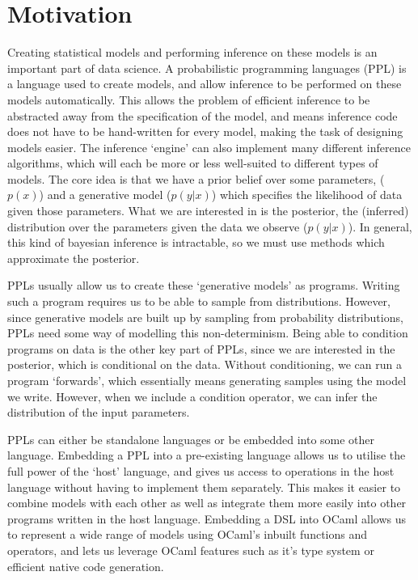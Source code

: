 \section{Motivation}

Creating statistical models and performing inference on these models is an important part of data science. A probabilistic programming languages (PPL) is a language used to create models, and allow inference to be performed on these models automatically. This allows the problem of efficient inference to be abstracted away from the specification of the model, and means inference code does not have to be hand-written for every model, making the task of designing models easier. The inference `engine' can also implement many different inference algorithms, which will each be more or less well-suited to different types of models. The core idea is that we have a prior belief over some parameters, ($p(x)$) and a generative model ($p(y|x)$) which specifies the likelihood of data given those parameters. What we are interested in is the posterior, the (inferred) distribution over the parameters given the data we observe ($p(y|x)$). In general, this kind of bayesian inference is intractable, so we must use methods which approximate the posterior.

PPLs usually allow us to create these `generative models' as programs. Writing such a program requires us to be able to sample from distributions. However, since generative models are built up by sampling from probability distributions, PPLs need some way of modelling this non-determinism. Being able to condition programs on data is the other key part of PPLs, since we are interested in the posterior, which is conditional on the data. Without conditioning, we can run a program `forwards', which essentially means generating samples using the model we write. However, when we include a condition operator, we can infer the distribution of the input parameters.

PPLs can either be standalone languages or be embedded into some other language. Embedding a PPL into a pre-existing language allows us to utilise the full power of the `host' language, and gives us access to operations in the host language without having to implement them separately. This makes it easier to combine models with each other as well as integrate them more easily into other programs written in the host language. Embedding a DSL into OCaml allows us to represent a wide range of models using OCaml's inbuilt functions and operators, and lets us leverage OCaml features such as it's type system or efficient native code generation.


